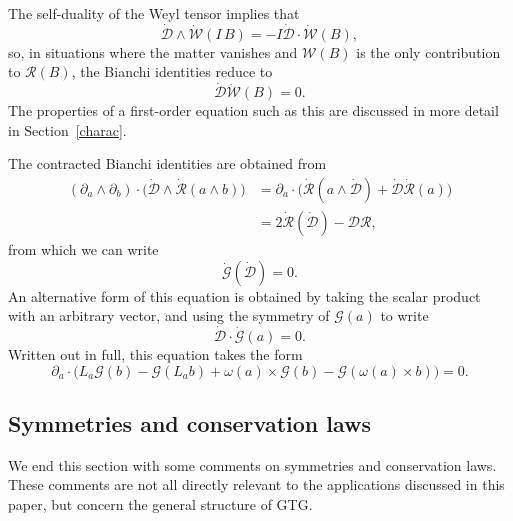 \documentclass[a4paper]{article}
\numberwithin{equation}{section}
\newcommand{\nn}{\nonumber}
\newcommand{\dt}{\! \cdot \!}
\newcommand{\wdg}{\! \wedge \!}
\newcommand{\crs}{\! \times \!}
\newcommand{\om}{\omega}
\newcommand{\cld}{{\mathcal{D}}}
\newcommand{\clg}{{\mathcal{G}}}
\newcommand{\clr}{{\mathcal{R}}}
\newcommand{\clw}{{\mathcal{W}}}
\newcommand{\da}{\partial_a}
\newcommand{\db}{\partial_b}
\newcommand{\cldd}{\dot{\cld}}
\begin{document}
The self-duality of the Weyl tensor implies that
%
\begin{equation}
\cldd \wdg \dot{\clw}(I\,B) = -I \cldd \dt \dot{\clw}(B),
\end{equation}
%
so, in situations where the matter vanishes and $\clw(B)$ is the only
contribution to $\clr(B)$, the Bianchi identities reduce to
%
\begin{equation}
\cldd \dot{\clw}(B) = 0.
\end{equation}
%
The properties of a first-order equation such as this are discussed in
more detail in Section~\ref{charac}.


The contracted Bianchi identities are obtained from
%
\begin{align}
(\da \wdg \db) \dt \bigl( \cldd \wdg \dot{\clr} (a \wdg b) \bigr)
&= \da \dt \bigl( \dot{\clr}(a \wdg \cldd) + \cldd  \dot{\clr}(a) \bigr) \nn \\
&= 2 \dot{\clr}(\cldd) - \cld \clr,
\end{align}
%
from which we can write
%
\begin{equation}
\dot{\clg}(\cldd) = 0.
\label{S-Bicont1}
\end{equation}
%
An alternative form of this equation is obtained by taking the scalar
product with an arbitrary vector, and using the symmetry of $\clg(a)$
to write
%
\begin{equation}
\cldd \dt \dot{\clg}(a) = 0.
\end{equation}
%
Written out in full, this equation takes the form
%
\begin{equation}
\da \dt \bigl(L_a \clg(b) - \clg(L_a b) + \om(a) \crs \clg(b) -
\clg(\om(a) \crs b) \bigr) = 0.
\label{S-Bicont}
\end{equation}
%



\subsection{Symmetries and conservation laws}
\label{SYMMCONS}

We end this section with some comments on symmetries and conservation
laws.  These comments are not all directly relevant to the
applications discussed in this paper, but concern the general
structure of GTG.
\end{document}

